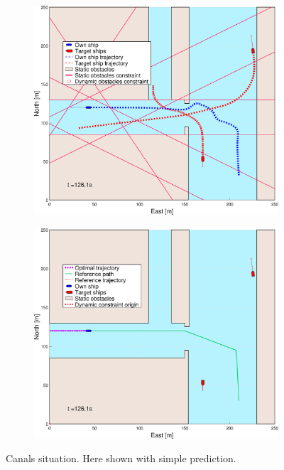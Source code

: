 \begin{figure}[ht]
\begin{subfigure}[b]{0.494\textwidth}
        \subcaption{}
    \end{subfigure}
    \hfill
    \\ 
    \begin{subfigure}[b]{0.494\textwidth}
        \centering
        \includegraphics[width=\textwidth]{Images/Figures/Havn1/_Simple_1fig1_time=126}
        \subcaption{}
    \end{subfigure}
    \hfill
    \begin{subfigure}[b]{0.494\textwidth}
        \centering
        \includegraphics[width=\textwidth]{Images/Figures/Havn1/_Simple_1fig999_time=126}
        \subcaption{}
    \end{subfigure}
    \hfill
    \caption{Canals situation. Here shown with simple prediction.}

\end{figure}
